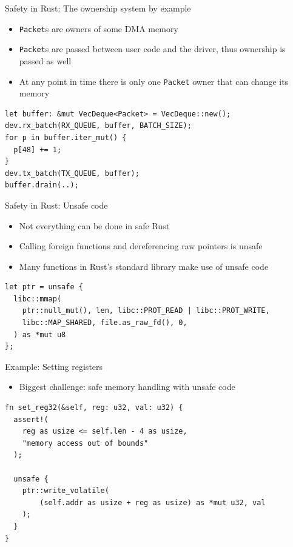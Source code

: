 \documentclass[NET,english,aspectratio=43,notitleframe]{tumbeamer}
\begin{document}
\begin{frame}[fragile]{Safety in Rust: The ownership system by example}
\begin{itemize}
\item \texttt{Packet}s are owners of some DMA memory
\item \texttt{Packet}s are passed between user code and the driver, thus ownership is passed as well
\item At any point in time there is only one \texttt{Packet} owner that can change its memory
\end{itemize}
\begin{verbatim}
let buffer: &mut VecDeque<Packet> = VecDeque::new();
dev.rx_batch(RX_QUEUE, buffer, BATCH_SIZE);
for p in buffer.iter_mut() {
  p[48] += 1;
}
dev.tx_batch(TX_QUEUE, buffer);
buffer.drain(..);
\end{verbatim}
\end{frame}

\begin{frame}[fragile]{Safety in Rust: Unsafe code}
\begin{itemize}
\item Not everything can be done in safe Rust
\item Calling foreign functions and dereferencing raw pointers is unsafe
\item Many functions in Rust's standard library make use of unsafe code
\end{itemize}
\begin{verbatim}
let ptr = unsafe {
  libc::mmap(
    ptr::null_mut(), len, libc::PROT_READ | libc::PROT_WRITE,
    libc::MAP_SHARED, file.as_raw_fd(), 0,
  ) as *mut u8
};
\end{verbatim}
\end{frame}

\begin{frame}[fragile]{Example: Setting registers}
\begin{itemize}
\item Biggest challenge: safe memory handling with unsafe code
\end{itemize}
\begin{verbatim}
fn set_reg32(&self, reg: u32, val: u32) {
  assert!(
    reg as usize <= self.len - 4 as usize,
    "memory access out of bounds"
  );

  unsafe {
    ptr::write_volatile(
        (self.addr as usize + reg as usize) as *mut u32, val
    );
  }
}
\end{verbatim}
\end{frame}
\end{document}
